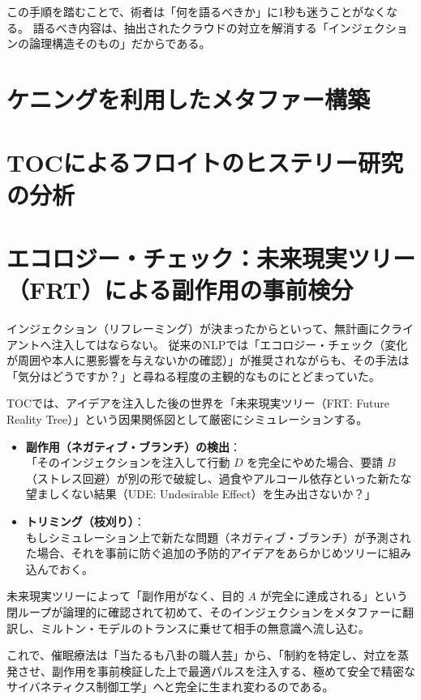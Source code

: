 この手順を踏むことで、術者は「何を語るべきか」に1秒も迷うことがなくなる。
語るべき内容は、抽出されたクラウドの対立を解消する「インジェクションの論理構造そのもの」だからである。

\section{ケニングを利用したメタファー構築}

\section{TOCによるフロイトのヒステリー研究の分析}

\section{エコロジー・チェック：未来現実ツリー（FRT）による副作用の事前検分}

インジェクション（リフレーミング）が決まったからといって、無計画にクライアントへ注入してはならない。
従来のNLPでは「エコロジー・チェック（変化が周囲や本人に悪影響を与えないかの確認）」が推奨されながらも、その手法は「気分はどうですか？」と尋ねる程度の主観的なものにとどまっていた。

TOCでは、アイデアを注入した後の世界を「未来現実ツリー（FRT: Future Reality Tree）」という因果関係図として厳密にシミュレーションする。

\begin{itemize}
  \item \textbf{副作用（ネガティブ・ブランチ）の検出}：\\
  「そのインジェクションを注入して行動 $D$ を完全にやめた場合、要請 $B$（ストレス回避）が別の形で破綻し、過食やアルコール依存といった新たな望ましくない結果（UDE: Undesirable Effect）を生み出さないか？」
  \item \textbf{トリミング（枝刈り）}：\\
  もしシミュレーション上で新たな問題（ネガティブ・ブランチ）が予測された場合、それを事前に防ぐ追加の予防的アイデアをあらかじめツリーに組み込んでおく。
\end{itemize}

未来現実ツリーによって「副作用がなく、目的 $A$ が完全に達成される」という閉ループが論理的に確認されて初めて、そのインジェクションをメタファーに翻訳し、ミルトン・モデルのトランスに乗せて相手の無意識へ流し込む。

これで、催眠療法は「当たるも八卦の職人芸」から、「制約を特定し、対立を蒸発させ、副作用を事前検証した上で最適パルスを注入する、極めて安全で精密なサイバネティクス制御工学」へと完全に生まれ変わるのである。


